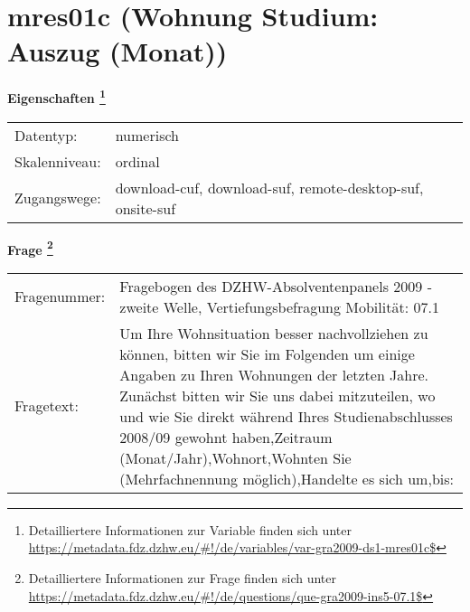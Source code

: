 
    \setcounter{footnote}{0}

    \vspace*{-1.8cm}
	\section{mres01c (Wohnung Studium: Auszug (Monat))}
	\label{section:mres01c}



    \vspace*{0.5cm}
    \noindent\textbf{Eigenschaften
	\footnote{Detailliertere Informationen zur Variable finden sich unter
		\url{https://metadata.fdz.dzhw.eu/\#!/de/variables/var-gra2009-ds1-mres01c$}}}\\
	\begin{tabularx}{\hsize}{@{}lX}
	Datentyp: & numerisch \\
	Skalenniveau: & ordinal \\
	Zugangswege: &
	  download-cuf, 
	  download-suf, 
	  remote-desktop-suf, 
	  onsite-suf
 \\
    \end{tabularx}



				\vspace*{0.5cm}
                \noindent\textbf{Frage
	                \footnote{Detailliertere Informationen zur Frage finden sich unter
		              \url{https://metadata.fdz.dzhw.eu/\#!/de/questions/que-gra2009-ins5-07.1$}}}\\
				\begin{tabularx}{\hsize}{@{}lX}
					Fragenummer: &
					  Fragebogen des DZHW-Absolventenpanels 2009 - zweite Welle, Vertiefungsbefragung Mobilität:
					  07.1
 \\
					Fragetext: & Um Ihre Wohnsituation besser nachvollziehen zu können, bitten wir Sie im Folgenden um einige Angaben zu Ihren Wohnungen der letzten Jahre. Zunächst bitten wir Sie uns dabei mitzuteilen, wo und wie Sie direkt während Ihres Studienabschlusses 2008/09 gewohnt haben,Zeitraum (Monat/Jahr),Wohnort,Wohnten Sie (Mehrfachnennung möglich),Handelte es sich um,bis: \\
				\end{tabularx}





